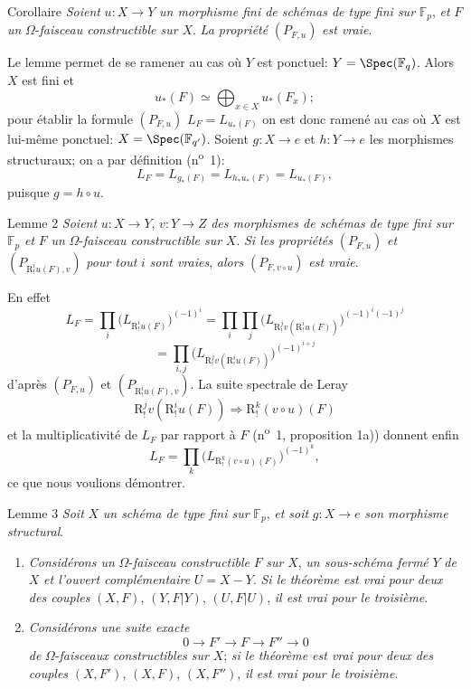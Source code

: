 \begin{statement}{Corollaire}
\emph{Soient} $u:X\to Y$ \emph{un morphisme fini de schémas de type fini sur} $\mathbb{F}_p$, \emph{et} $F$ \emph{un} $\Omega$-\emph{faisceau constructible sur} $X$. \emph{La propriété} $(P_{F,u})$ \emph{est vraie}.
\end{statement}

Le lemme permet de se ramener au cas où $Y$ est ponctuel: $Y=\Spec(\mathbb{F}_q)$. Alors $X$ est fini et
\[
u_*(F)\simeq \bigoplus_{x\in X}u_*(F_x);
\]
pour établir la formule $(P_{F,u})$ $L_F=L_{u_*(F)}$ on est donc ramené au cas où $X$ est lui-même ponctuel: $X=\Spec(\mathbb{F}_{q'})$. Soient $g:X\to e$ et $h:Y\to e$ les morphismes structuraux; on a par définition (n\textsuperscript{o}~1):
\[
L_F=L_{g_*(F)}=L_{h_*u_*(F)}=L_{u_*(F)},
\]
puisque $g=h\circ u$.

\begin{statement}{Lemme 2}
\emph{Soient} $u:X\to Y$, $v:Y\to Z$ \emph{des morphismes de schémas de type fini sur} $\mathbb{F}_p$ \emph{et} $F$ \emph{un} $\Omega$-\emph{faisceau constructible sur} $X$. \emph{Si les propriétés} $(P_{F,u})$ \emph{et} $(P_{\mathrm{R}^i_!u(F),v})$ \emph{pour tout} $i$ \emph{sont vraies}, \emph{alors} $(P_{F,v\circ u})$ \emph{est vraie}.
\end{statement}

En effet
\[
L_F=\prod_i\bigl(L_{\mathrm{R}^i_!u(F)}\bigr)^{(-1)^i}
 =\prod_i\prod_j\bigl(L_{\mathrm{R}^j_!v(\mathrm{R}^i_!u(F))}\bigr)^{(-1)^i(-1)^j}
\]
\[
=\prod_{i,j}\bigl(L_{\mathrm{R}^j_!v(\mathrm{R}^i_!u(F))}\bigr)^{(-1)^{i+j}}
\]
d'après $(P_{F,u})$ et $(P_{\mathrm{R}^i_!u(F),v})$. La suite spectrale de Leray
\[
\mathrm{R}^j_!v(\mathrm{R}^i_!u(F))\Longrightarrow \mathrm{R}^k_!(v\circ u)(F)
\]
et la multiplicativité de $L_F$ par
rapport à $F$ (n\textsuperscript{o}~1, proposition 1a)) donnent enfin
\[
L_F=\prod_k\bigl(L_{\mathrm{R}^k_!(v\circ u)(F)}\bigr)^{(-1)^k},
\]
ce que nous voulions démontrer.

\begin{statement}{Lemme 3}
\emph{Soit} $X$ \emph{un schéma de type fini sur} $\mathbb{F}_p$, \emph{et soit} $g:X\to e$ \emph{son morphisme structural}.
\begin{enumerate}[label=\alph*)]
\item \emph{Considérons un} $\Omega$-\emph{faisceau constructible} $F$ \emph{sur} $X$, \emph{un sous-schéma fermé} $Y$ \emph{de} $X$ \emph{et l'ouvert complémentaire} $U=X-Y$. \emph{Si le théorème est vrai pour deux des couples} $(X,F)$, $(Y,F|Y)$, $(U,F|U)$, \emph{il est vrai pour le troisième}.
\item \emph{Considérons une suite exacte}
\[
0\longrightarrow F'\longrightarrow F\longrightarrow F''\longrightarrow0
\]
\emph{de} $\Omega$-\emph{faisceaux constructibles sur} $X$; \emph{si le théorème est vrai pour deux des couples} $(X,F')$, $(X,F)$, $(X,F'')$, \emph{il est vrai pour le troisième}.
\end{enumerate}
\end{statement}

